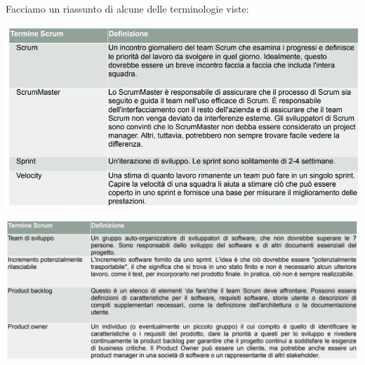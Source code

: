 \documentclass[12pt]{article}
\begin{document}
Facciamo un riassunto di alcune delle terminologie viste:
\begin{center}
    \includegraphics[width = 1\textwidth]{Images/24.png}
\end{center}
\begin{center}
    \includegraphics[width = 1.10\textwidth]{Images/25.png}
\end{center}
\end{document}
